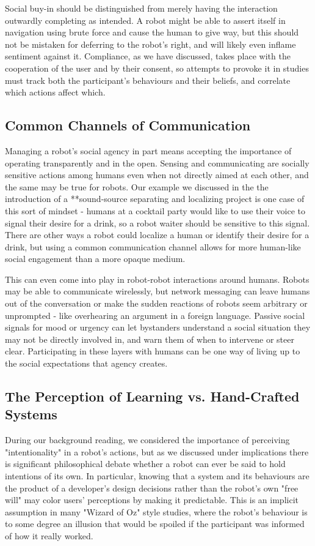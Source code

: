 \documentclass{sfuthesis}
\begin{document}
Social buy-in should be distinguished from merely having the interaction outwardly completing as intended. A robot might be able to assert itself in navigation using brute force and cause the human to give way, but this should not be mistaken for deferring to the robot's right, and will likely even inflame sentiment against it. Compliance, as we have discussed, takes place with the cooperation of the user and by their consent, so attempts to provoke it in studies must track both the participant's behaviours and their beliefs, and correlate which actions affect which.

\subsection{Common Channels of Communication}

Managing a robot's social agency in part means accepting the importance of operating transparently and in the open. Sensing and communicating are socially sensitive actions among humans even when not directly aimed at each other, and the same may be true for robots. Our example we discussed in the the introduction of a **sound-source separating and localizing project is one case of this sort of mindset - humans at a cocktail party would like to use their voice to signal their desire for a drink, so a robot waiter should be sensitive to this signal. There are other ways a robot could localize a human or identify their desire for a drink, but using a common communication channel allows for more human-like social engagement than a more opaque medium.

This can even come into play in robot-robot interactions around humans. Robots may be able to communicate wirelessly, but network messaging can leave humans out of the conversation or make the sudden reactions of robots seem arbitrary or unprompted - like overhearing an argument in a foreign language. Passive social signals for mood or urgency can let bystanders understand a social situation they may not be directly involved in, and warn them of when to intervene or steer clear. Participating in these layers with humans can be one way of living up to the social expectations that agency creates.

\subsection{The Perception of Learning vs. Hand-Crafted Systems}

During our background reading, we considered the importance of perceiving "intentionality" in a robot's actions, but as we discussed under implications there is significant philosophical debate whether a robot can ever be said to hold intentions of its own. In particular, knowing that a system and its behaviours are the product of a developer's design decisions rather than the robot's own "free will" may color users' perceptions by making it predictable. This is an implicit assumption in many "Wizard of Oz" style studies, where the robot's behaviour is to some degree an illusion that would be spoiled if the participant was informed of how it really worked.
\end{document}
